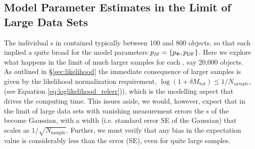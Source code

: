 \subsection{Model Parameter Estimates in the Limit of Large Data Sets} \label{sec:largedata}

The individual \MAP{}s in \citet{bov13} contained typically between 100 and 800 objects, so that each \MAP{} implied a quite broad \pdf{} for the model parameters $p_M{}=\{p_\Phi,p_\text{DF}\}$. Here we explore what happens in the limit of much larger samples for each \MAP{}, say 20,000 objects. As outlined in \S\ref{sec:likelihood} the immediate consequence of larger samples is given by the likelihood normalization requirement, $\log(1+\delta M_\text{tot})\le 1/N_{sample}$, (see Equation \ref{eq:loglikelihood_relerr})), which is the modelling aspect that drives the computing time. This issues aside, we would, however, expect that in the limit of large data sets with vanishing measurement errors the \pdf{}s of the \pmodel{} become Gaussian, with a \pdf{} width (i.e. standard error SE of the Gaussian) that scales as $1/\sqrt{N_\text{sample}}$. Further, we must verify that any bias in the \pdf{} expectation value is considerably less than the error (SE), even for quite large samples.

